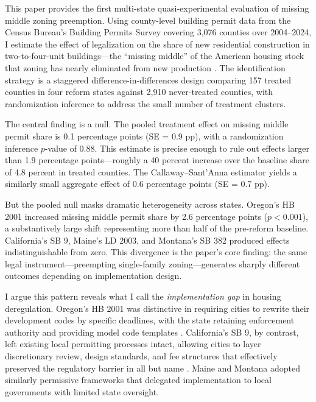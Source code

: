 \documentclass[12pt]{article}
\begin{document}
This paper provides the first multi-state quasi-experimental evaluation of missing middle zoning preemption. Using county-level building permit data from the Census Bureau's Building Permits Survey covering 3,076 counties over 2004--2024, I estimate the effect of legalization on the share of new residential construction in two-to-four-unit buildings---the ``missing middle'' of the American housing stock that zoning has nearly eliminated from new production \citep{gray2023}. The identification strategy is a staggered difference-in-differences design comparing 157 treated counties in four reform states against 2,910 never-treated counties, with randomization inference to address the small number of treatment clusters.

The central finding is a null. The pooled treatment effect on missing middle permit share is 0.1 percentage points (SE = 0.9 pp), with a randomization inference $p$-value of 0.88. This estimate is precise enough to rule out effects larger than 1.9 percentage points---roughly a 40 percent increase over the baseline share of 4.8 percent in treated counties. The Callaway--Sant'Anna estimator yields a similarly small aggregate effect of 0.6 percentage points (SE = 0.7 pp).

But the pooled null masks dramatic heterogeneity across states. Oregon's HB 2001 increased missing middle permit share by 2.6 percentage points ($p < 0.001$), a substantively large shift representing more than half of the pre-reform baseline. California's SB 9, Maine's LD 2003, and Montana's SB 382 produced effects indistinguishable from zero. This divergence is the paper's core finding: the same legal instrument---preempting single-family zoning---generates sharply different outcomes depending on implementation design.

I argue this pattern reveals what I call the \textit{implementation gap} in housing deregulation. Oregon's HB 2001 was distinctive in requiring cities to rewrite their development codes by specific deadlines, with the state retaining enforcement authority and providing model code templates \citep{oregon2020}. California's SB 9, by contrast, left existing local permitting processes intact, allowing cities to layer discretionary review, design standards, and fee structures that effectively preserved the regulatory barrier in all but name \citep{Murray2022}. Maine and Montana adopted similarly permissive frameworks that delegated implementation to local governments with limited state oversight.
\end{document}
